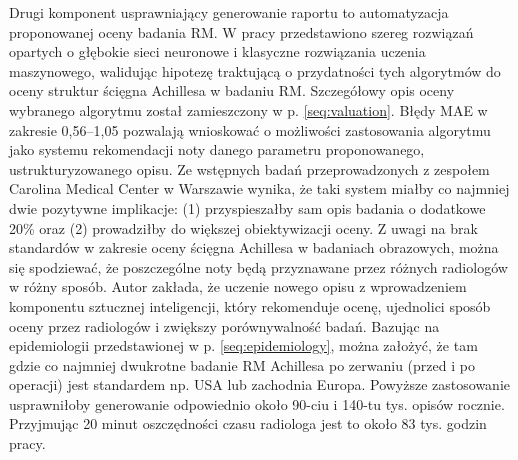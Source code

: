Drugi komponent usprawniający generowanie raportu to automatyzacja proponowanej oceny badania RM. W pracy przedstawiono szereg rozwiązań opartych o głębokie sieci neuronowe i klasyczne rozwiązania uczenia maszynowego, walidując hipotezę traktującą o przydatności tych algorytmów do oceny struktur ścięgna Achillesa w badaniu RM. Szczegółowy opis oceny wybranego algorytmu został zamieszczony w p. \ref{seq:valuation}. Błędy MAE w zakresie 0,56--1,05 pozwalają wnioskować o możliwości zastosowania algorytmu jako systemu rekomendacji noty danego parametru proponowanego, ustrukturyzowanego opisu. Ze wstępnych badań przeprowadzonych z zespołem Carolina Medical Center w Warszawie wynika, że taki system miałby co najmniej dwie pozytywne implikacje: (1) przyspieszałby sam opis badania o dodatkowe 20\% oraz (2) prowadziłby do większej obiektywizacji oceny. Z uwagi na brak standardów w zakresie oceny ścięgna Achillesa w badaniach obrazowych, można się spodziewać, że poszczególne noty będą przyznawane przez różnych radiologów w różny sposób. Autor zakłada, że uczenie nowego opisu z wprowadzeniem komponentu sztucznej inteligencji, który rekomenduje ocenę, ujednolici sposób oceny przez radiologów i zwiększy porównywalność badań. Bazując na epidemiologii przedstawionej w p. \ref{seq:epidemiology}, można założyć, że tam gdzie co najmniej dwukrotne badanie RM Achillesa po zerwaniu (przed i po operacji) jest standardem np. USA lub zachodnia Europa. Powyższe zastosowanie usprawniłoby generowanie odpowiednio około 90-ciu i 140-tu tys. opisów rocznie. Przyjmując 20 minut oszczędności czasu radiologa jest to około 83 tys. godzin pracy.

